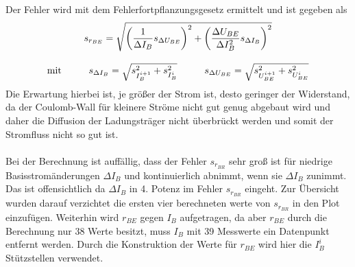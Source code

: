 Der Fehler wird mit dem Fehlerfortpflanzungsgesetz ermittelt und ist gegeben als
\begin{gather}
    s_{r_{BE}}=\sqrt{\left(\frac{1}{\Delta I_B}s_{\Delta U_{BE}}\right)^2+\left(\frac{\Delta U_{BE}}{\Delta I_B^2}s_{\Delta I_B}\right)^2}\\[0.3cm]
    \text{mit}\hspace*{1cm} s_{\Delta I_B}=\sqrt{s_{I^{i+1}_B}^2+s_{I^{i}_B}^2}\hspace*{1cm} s_{\Delta U_{BE}}=\sqrt{s_{U^{i+1}_{BE}}^2+s_{U^{i}_{BE}}^2}
\end{gather}
Die Erwartung hierbei ist, je größer der Strom ist, desto geringer der Widerstand, da der Coulomb-Wall für kleinere Ströme nicht gut genug abgebaut wird und daher die Diffusion der Ladungsträger nicht überbrückt werden und somit der Stromfluss nicht so gut ist. \\
\\ Bei der Berechnung ist auffällig, dass der Fehler $s_{r_{BR}}$ sehr groß ist für niedrige Basisstromänderungen $\Delta I_B$ und kontinuierlich abnimmt, wenn sie $\Delta I_B$ zunimmt. Das ist offensichtlich da $\Delta I_B$ in 4. Potenz im Fehler $s_{r_{BR}}$ eingeht. Zur Übersicht wurden darauf verzichtet die ersten vier berechneten werte von $s_{r_{BR}}$ in den Plot einzufügen. Weiterhin wird $r_{BE}$ gegen $I_B$ aufgetragen, da aber $r_{BE}$ durch die Berechnung nur 38 Werte besitzt, muss $I_B$ mit 39 Messwerte ein Datenpunkt entfernt werden. Durch die Konstruktion der Werte für $r_{BE}$ wird hier die $I^i_B$ Stützstellen verwendet.
\newpage
